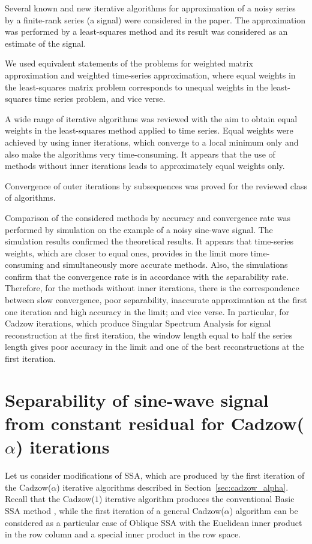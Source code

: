 \documentclass[sii]{ipart}
\begin{document}
Several known and new iterative algorithms for approximation of a noisy series by a finite-rank series (a signal) were considered in the paper. The approximation was performed by a least-squares method and its result was considered as an estimate of the signal.

 We used equivalent statements of the problems for weighted matrix approximation and  weighted time-series approximation, where equal weights in the least-squares matrix problem corresponds
 to unequal weights in the least-squares time series problem, and vice verse.

A wide range of iterative algorithms was reviewed with the aim to obtain equal weights in the least-squares method applied to time series.
Equal weights were achieved by using inner iterations, which converge to a local minimum only and also make the algorithms very time-consuming. It appears that the use of methods without inner iterations leads to approximately equal weights only.

Convergence of outer iterations by subsequences was proved for the reviewed class of algorithms.

Comparison of the considered methods by accuracy and convergence rate was performed by simulation on the example of a noisy sine-wave signal. The simulation results confirmed the theoretical results. It appears that time-series weights, which are closer to equal ones, provides in the limit more time-consuming and simultaneously more accurate methods.
Also, the simulations confirm that the convergence rate is in accordance with the separability rate. Therefore, for the methods without inner iterations,
there is the correspondence between slow convergence, poor separability,
inaccurate approximation at the first one iteration and high accuracy in the limit; and vice verse.
In particular, for Cadzow iterations, which produce Singular Spectrum Analysis for signal reconstruction at the first iteration, the window length equal to half the series length gives poor accuracy in the limit and
one of the best reconstructions at the first iteration.


\appendix

\section{Separability of sine-wave signal from constant residual for Cadzow($\alpha$) iterations}
\label{sec:app}

Let us consider modifications of SSA, which are produced by the first iteration of the Cadzow($\alpha$) iterative algorithms described in Section~\ref{sec:cadzow_alpha}. Recall that the Cadzow($1$) iterative algorithm produces the conventional Basic SSA method \cite{Golyandina.etal2001,Golyandina.Zhigljavsky2012}, while the first iteration of a general Cadzow($\alpha$) algorithm can be considered as a
particular case of Oblique SSA \cite{Golyandina2013} with the Euclidean inner product in the row column and a special inner product in the row space.
\end{document}
